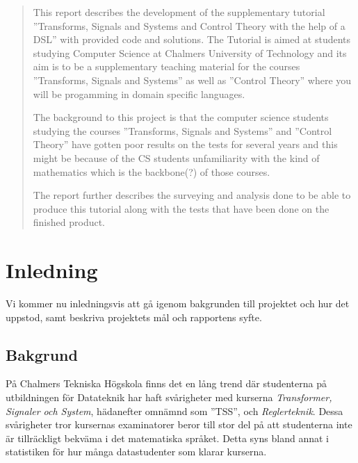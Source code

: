 \documentclass[]{article}
\begin{document}
\renewcommand*\abstractname{Abstract}
\begin{abstract}
This report describes the development of the supplementary tutorial ''Transforms, Signals and Systems and Control Theory with the help of a DSL'' with provided code and solutions. The Tutorial is aimed at students studying Computer Science at Chalmers University of Technology and its aim is to be a supplementary teaching material for the courses ''Transforms, Signals and Systems'' as well as ''Control Theory'' where you will be progamming in domain specific languages.

The background to this project is that the computer science students studying the courses ''Transforms, Signals and Systems'' and ''Control Theory'' have gotten poor results on the tests for several years and this might be because of the CS students unfamiliarity with the kind of mathematics which is the backbone(?) of those courses. 

The report further describes the surveying and analysis done to be able to produce this tutorial along with the tests that have been done on the finished product.
\end{abstract}
\newpage



\newpage
\tableofcontents

\newpage

\printglossary[title=Ordlista,nonumberlist]

\newpage

\setlength{\parskip}{2mm}
\setlength{\parindent}{0pt}


\section{Inledning}
Vi kommer nu inledningsvis att gå igenom bakgrunden till projektet och hur det uppstod, samt beskriva projektets mål och rapportens syfte.

\subsection{Bakgrund}
%

På Chalmers Tekniska Högskola finns det en lång trend där
studenterna på utbildningen för Datateknik har haft svårigheter
med kurserna \textit{Transformer, Signaler och System}, hädanefter omnämnd
som ''\gls{TSS}'', och \textit{Reglerteknik}.
Dessa svårigheter tror kursernas examinatorer beror till stor del på att
studenterna inte är tillräckligt bekväma i det matematiska språket.
Detta syns bland annat i statistiken för hur många datastudenter som
klarar kurserna. 
\end{document}
